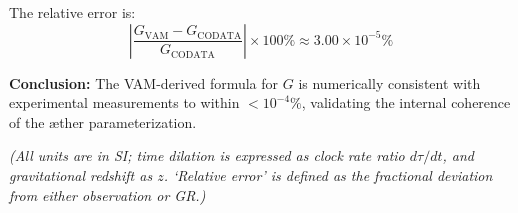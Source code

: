 The relative error is:
\[
\left| \frac{G_\text{VAM} - G_\text{CODATA}}{G_\text{CODATA}} \right| \times 100\% \approx 3.00 \times 10^{-5}\%
\]

\noindent
\textbf{Conclusion:} The VAM-derived formula for \( G \) is numerically consistent with experimental measurements to within \( < 10^{-4}\% \), validating the internal coherence of the æther parameterization.

\textit{(All units are in SI; time dilation is expressed as clock rate ratio $d\tau/dt$, and gravitational redshift as $z$. ‘Relative error' is defined as the fractional deviation from either observation or GR.)}


